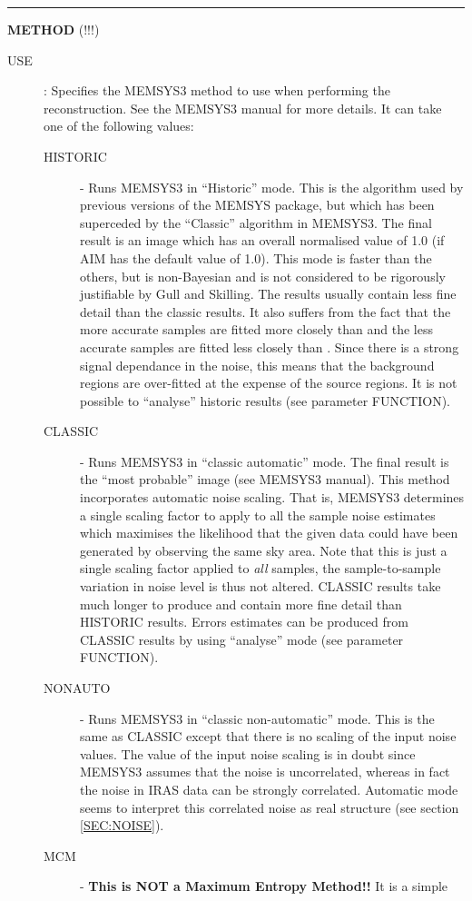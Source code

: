 \rule{\textwidth}{0.3mm}
{\Large {\bf METHOD} (!!!)}
\begin{description}
\item [USE]:
Specifies the MEMSYS3 method to use when performing the reconstruction. See the
MEMSYS3 manual for more details. It can take one of the following values:
\begin {description}
\item [HISTORIC] - Runs MEMSYS3 in ``Historic'' mode. This is the algorithm used
by previous versions of the MEMSYS package, but which has been superceded by
the ``Classic'' algorithm in MEMSYS3. The final result is
an image which has an overall normalised \chisq value of 1.0 (if AIM has the default
value of 1.0). This mode is faster than the others, but is non-Bayesian and
is not considered to be rigorously justifiable by Gull and Skilling.
The results usually contain less fine detail than the classic results. It also
suffers from the fact that the more accurate samples are fitted more closely
than  and the less accurate samples are fitted less closely than
. Since there is a strong signal dependance in the
noise, this means that the background regions are over-fitted at the expense of
the source regions. It is not possible to ``analyse'' historic results (see
parameter FUNCTION).
\item [CLASSIC] - Runs MEMSYS3 in ``classic automatic'' mode. The final result
is the ``most probable'' image (see MEMSYS3 manual). This method incorporates
automatic noise scaling. That is, MEMSYS3 determines a single scaling factor to
apply to all the sample noise estimates which maximises the likelihood that the
given data could have been generated by observing the same sky area. Note that
this is just a single scaling factor applied to {\em all} samples, the
sample-to-sample variation in noise level is thus not altered. CLASSIC results
take much longer to produce and contain more fine detail than HISTORIC results.
Errors estimates can be produced from CLASSIC results by using  ``analyse''
mode (see parameter FUNCTION).
\item [NONAUTO] - Runs MEMSYS3 in ``classic non-automatic'' mode. This is the
same as CLASSIC except that there is no scaling of the input noise values. The
value of the input noise scaling is in doubt since MEMSYS3 assumes that the
noise is uncorrelated, whereas in fact the noise in IRAS data can be strongly
correlated. Automatic mode seems to interpret this correlated noise as real
structure (see section \ref {SEC:NOISE}).
\item [MCM] - {\bf This is NOT a Maximum Entropy Method!!} It is a simple

\end{description}
\end{description}
